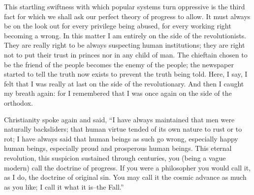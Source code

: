 \documentclass{book}
\begin{document}
This startling swiftness with which popular systems turn oppressive is the third fact for which we shall ask our perfect theory of progress to allow. It must always be on the look out for every privilege being abused, for every working right becoming a wrong. In this matter I am entirely on the side of the revolutionists. They are really right to be always suspecting human institutions; they are right not to put their trust in princes nor in any child of man. The chieftain chosen to be the friend of the people becomes the enemy of the people; the newspaper started to tell the truth now exists to prevent the truth being told. Here, I say, I felt that I was really at last on the side of the revolutionary. And then I caught my breath again: for I remembered that I was once again on the side of the orthodox.

Christianity spoke again and said, “I have always maintained that men were naturally backsliders; that human virtue tended of its own nature to rust or to rot; I have always said that human beings as such go wrong, especially happy human beings, especially proud and prosperous human beings. This eternal revolution, this suspicion sustained through centuries, you (being a vague modern) call the doctrine of progress. If you were a philosopher you would call it, as I do, the doctrine of original sin. You may call it the cosmic advance as much as you like; I call it what it is–the Fall.”
\end{document}
